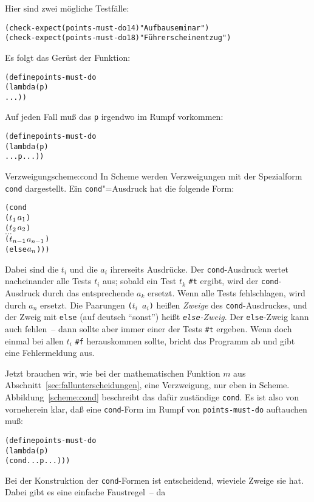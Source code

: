 Hier sind zwei mögliche Testfälle:
%
\begin{alltt}
(check-expect (points-must-do 14) "Aufbauseminar")
(check-expect (points-must-do 18) "Führerscheinentzug")
\end{alltt}   
%
Es folgt das Gerüst der Funktion:
%
\begin{alltt}
(define points-must-do
  (lambda (p)
    ...))
\end{alltt}
%
Auf jeden Fall muß das \texttt{p} irgendwo im Rumpf vorkommen:
%
\begin{alltt}
(define points-must-do
  (lambda (p)
    ... p ...))
\end{alltt}
%
\begin{feature}{Verzweigung}{scheme:cond}
In Scheme werden Verzweigungen
mit der Spezialform \texttt{cond} dargestellt.
Ein \texttt{cond}"=Ausdruck hat die folgende Form:
%
\begin{alltt}
(cond
  (\(t\sb{1}\) \(a\sb{1}\))
  (\(t\sb{2}\) \(a\sb{2}\))
  \(\ldots\)
  (\(t\sb{n-1}\) \(a\sb{n-1}\))
  (else \(a\sb{n}\))))
\end{alltt}
%
Dabei sind die $t_i$ und die $a_i$ ihrerseits Ausdrücke.  Der
\texttt{cond}-Ausdruck wertet nacheinander alle Tests $t_i$ aus;
sobald ein Test $t_k$ \texttt{\#t} ergibt, wird der
\texttt{cond}-Ausdruck durch das entsprechende $a_k$ ersetzt.  Wenn
alle Tests fehlschlagen, wird durch $a_n$ ersetzt.  Die Paarungen
\texttt{($t_i$ $a_i$)} heißen \textit{Zweige} des
\texttt{cond}-Ausdruckes, und der Zweig mit \texttt{else} (auf deutsch
"`sonst"') heißt
\textit{\texttt{else}-Zweig}.
Der \texttt{else}-Zweig kann auch fehlen~-- dann sollte aber immer
einer der Tests \texttt{\#t} ergeben.  Wenn doch einmal bei allen
$t_i$ \verb|#f| herauskommen sollte, bricht \drscheme{} das Programm ab
und gibt eine Fehlermeldung aus.
\end{feature}
%
Jetzt brauchen wir, wie bei der mathematischen Funktion $m$ aus
Abschnitt~\ref{sec:fallunterscheidungen}, eine Verzweigung, nur eben
in Scheme.  Abbildung~\ref{scheme:cond} beschreibt das dafür
zuständige \texttt{cond}.   Es ist also von vorneherein klar, daß eine
\texttt{cond}-Form im Rumpf von \texttt{points-must-do} auftauchen muß:
%
\begin{alltt}
(define points-must-do
  (lambda (p)
    (cond ... p ...)))
\end{alltt}
%
Bei der Konstruktion der \texttt{cond}-Formen ist entscheidend,
wieviele Zweige sie hat.  Dabei gibt es eine einfache Faustregel~-- da
